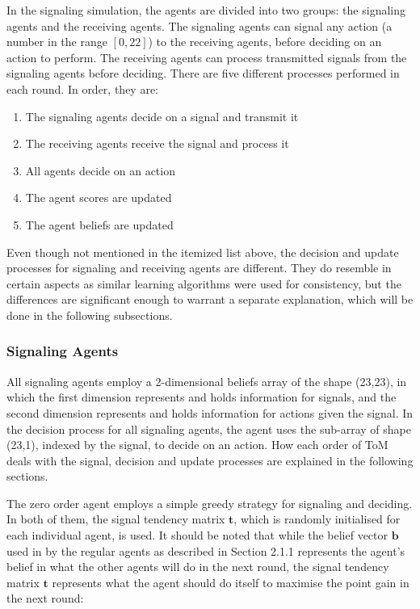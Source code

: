 In the signaling simulation, the agents are divided into two groups: the signaling agents and the receiving agents. The signaling agents can signal any action (a number in the range $[0,22]$) to the receiving agents, before deciding on an action to perform. The receiving agents can process transmitted signals from the signaling agents before deciding. There are five different processes performed in each round. In order, they are:

\begin{enumerate}
    \item The signaling agents decide on a signal and transmit it
    \item The receiving agents receive the signal and process it
    \item All agents decide on an action
    \item The agent scores are updated  
    \item The agent beliefs are updated
\end{enumerate}

Even though not mentioned in the itemized list above, the decision and update processes for signaling and receiving agents are different. They do resemble in certain aspects as similar learning algorithms were used for consistency, but the differences are significant enough to warrant a separate explanation, which will be done in the following subsections.

\subsubsection{Signaling Agents}

All signaling agents employ a 2-dimensional beliefs array of the shape (23,23), in which the first dimension represents and holds information for signals, and the second dimension represents and holds information for actions given the signal. In the decision process for all signaling agents, the agent uses the sub-array of shape (23,1), indexed by the signal, to decide on an action. How each order of ToM deals with the signal, decision and update processes are explained in the following sections.


The zero order agent employs a simple greedy strategy for signaling and deciding. In both of them, the signal tendency matrix $\mathbf{t}$, which is randomly initialised for each individual agent, is used. It should be noted that while the belief vector $\mathbf{b}$ used in by the regular agents as described in Section 2.1.1 represents the agent's belief in what the other agents will do in the next round, the signal tendency matrix $\mathbf{t}$ represents what the agent should do itself to maximise the point gain in the next round: 

